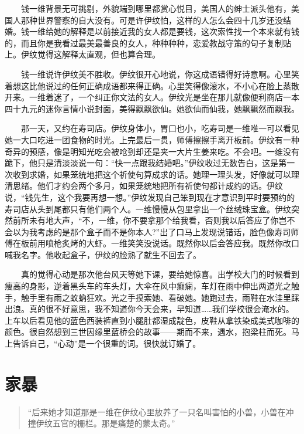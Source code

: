 \documentclass[12pt,UTF8]{ctexbook}
\begin{document}
　　钱一维背景无可挑剔，外貌端到哪里都赏心悦目，美国人的绅士派头他有，美国人那种世界警察的自大没有。可是许伊纹怕，这样的人怎么会四十几岁还没结婚。钱一维给她的解释是以前接近我的女人都是要钱，这次索性找一个本来就有钱的，而且你是我看过最美最善良的女人，种种种种，恋爱教战守策的句子复制贴上。伊纹觉得这解释太直观，但也算合理。

　　钱一维说许伊纹美不胜收。伊纹很开心地说，你这成语错得好诗意啊。心里笑着想这比他说过的任何正确成语都来得正确。心里笑得像滚水，不小心在脸上蒸散开来。一维着迷了，一个纠正你文法的女人。伊纹光是坐在那儿就像便利商店一本四十九元的迷你言情小说封面，美得飘飘欲仙。她欲仙而仙我，她飘飘然而飘我。

　　那一天，又约在寿司店。伊纹身体小，胃口也小，吃寿司是一维唯一可以看见她一大口吃进一团食物的时光。上完最后一贯，师傅擦擦手离开板前。伊纹有一种奇异的预感，像是明知光吃会被呛到却还是夹一大片生姜来吃。不会吧。一维没有跪下，他只是清淡淡说一句：\enquote{快一点跟我结婚吧。}伊纹收过无数告白，这是第一次收到求婚，如果笼统地把这个祈使句算成求的话。她理一理头发，好像就可以理清思绪。他们才约会两个多月，如果笼统地把所有祈使句都计成约的话。伊纹说，\enquote{钱先生，这个我要再想一想。}伊纹发现自己笨到现在才意识到平时要预约的寿司店从头到尾都只有他们两个人。一维慢慢从包里拿出一个丝绒珠宝盒。伊纹突然前所未有地大声，\enquote{不，一维，你不要拿那个给我看，否则我以后答应了你岂不会以为我考虑的是那个盒子而不是你本人?}出了口马上发现说错话，脸色像寿司师傅在板前用喷枪炙烤的大虾。一维笑笑没说话。既然你以后会答应我。既然你改口喊我名字。他收起盒子，伊纹的脸熟了就生不回去了。

　　真的觉得心动是那次他台风天等她下课，要给她惊喜。出学校大门的时候看到瘦高的身影，逆着黑头车的车头灯，大伞在风中癫痫，车灯在雨中伸出两道光之触手，触手里有雨之蚊蚋狂欢。光之手摸索她、看破她。她跑过去，雨鞋在水洼里踩出浪。真的很不好意思，我不知道你今天会来，早知道\ldots{}\ldots{}我们学校很会淹水的。上车以后看见他的蓝色西装裤直到小腿肚都湿成靛色，皮鞋从拿铁染成美式咖啡的颜色。很自然想到三世因缘里蓝桥会的故事------期而不来，遇水，抱梁柱而死。马上告诉自己，\enquote{心动}是一个很重的词。很快就订婚了。

\hypertarget{ux5bb6ux66b4}{%
\section*{家暴}\label{ux5bb6ux66b4}}

\begin{quote}
\enquote{后来她才知道那是一维在伊纹心里放养了一只名叫害怕的小兽，小兽在冲撞伊纹五官的栅栏。那是痛楚的蒙太奇。}
\end{quote}
\end{document}
